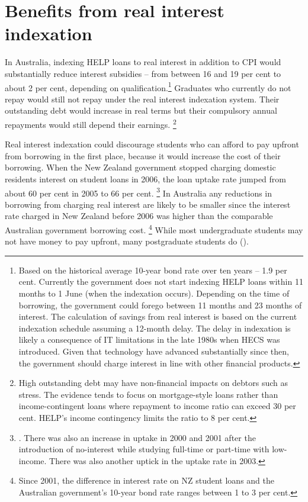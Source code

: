 \documentclass[embargoed]{grattan}
\begin{document}
\section{Benefits from real interest indexation}\label{benefits-from-real-interest-indexation}

In Australia, indexing \gls{HELP} loans to real interest in addition to \gls{CPI} would substantially reduce interest subsidies -- from between 16 and 19 per cent to about 2 per cent, depending on qualification.\protect\hypertarget{_Ref335647424}{}{}\footnote{Based on the historical average 10-year bond rate over ten years -- 1.9 per cent.
Currently the government does not start indexing \gls{HELP} loans within 11 months to 1 June (when the indexation occurs).
Depending on the time of borrowing, the government could forego between 11 months and 23 months of interest.
The calculation of savings from real interest is based on the current indexation schedule assuming a 12-month delay.
The delay in indexation is likely a consequence of IT limitations in the late 1980s when \gls{HECS} was introduced.
Given that technology have advanced substantially since then, the government should charge interest in line with other financial products.} Graduates who currently do not repay would still not repay under the real interest indexation system.
Their outstanding debt would increase in real terms but their compulsory annual repayments would still depend their earnings.%
\footnote{High outstanding debt may have non-financial impacts on debtors such as stress.
The evidence tends to focus on mortgage-style loans rather than income-contingent loans where repayment to income ratio can exceed 30 per cent.
\gls{HELP}'s income contingency limits the ratio to 8 per cent.\label{fn:68-High-outstanding-debt-non-fin-impact}}

Real interest indexation could discourage students who can afford to pay upfront from borrowing in the first place, because it would increase the cost of their borrowing.
When the New Zealand government stopped charging domestic residents interest on student loans in 2006, the loan uptake rate jumped from about 60 per cent in 2005 to 66 per cent.%
\footnote{\textcite[][23]{EducationNZ2013Studentloanscheme}. 
There was also an increase in uptake in 2000 and 2001 after the introduction of no-interest while studying full-time or part-time with low-income.
There was also another uptick in the uptake rate in 2003.} 
In Australia any reductions in borrowing from charging real interest are likely to be smaller since the interest rate charged in New Zealand before 2006 was higher than the comparable Australian government borrowing cost.%
\footnote{Since 2001, the difference in interest rate on NZ student loans and the Australian government's 10-year bond rate ranges between 1 to 3 per cent.} While most undergraduate students may not have money to pay upfront, many postgraduate students do ().
\end{document}
